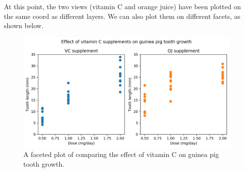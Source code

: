 \documentclass[a4paper, openany]{memoir}
\begin{document}
At this point, the two views (vitamin C and orange juice) have been plotted on the same coord as different layers. We can also plot them on different facets, as shown below.
\begin{figure}[H]
    \centering
    \includegraphics[scale=0.5]{src/2.15 VitC Example Plot 5.png}
    \caption{A faceted plot of comparing the effect of vitamin C on guinea pig tooth growth.}
\end{figure}
\end{document}
